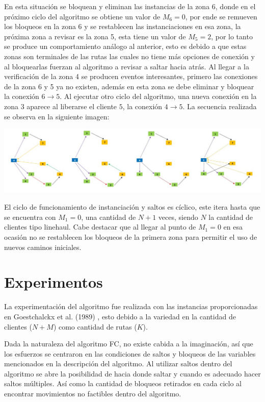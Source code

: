 \documentclass[letter, 10pt]{article}
\begin{document}
En esta situación se bloquean y eliminan las instancias de la zona 6, donde en el próximo ciclo del algoritmo se obtiene un valor de $M_6=0$, por ende se remueven los bloqueos en la zona 6 y se restablecen las instanciaciones en esa zona, la próxima zona a revisar es la zona 5, esta tiene un valor de $M_5=2$, por lo tanto se produce un comportamiento análogo al anterior, esto es debido a que estas zonas son terminales de las rutas las cuales no tiene más opciones de conexión y al bloquearlas fuerzan al algoritmo a revisar a saltar hacia atrás. Al llegar a la verificación de la zona 4 se producen eventos interesantes, primero las conexiones de la zona 6 y 5 ya no existen, además en esta zona se debe eliminar y bloquear la conexión $6 \rightarrow 5$. Al ejecutar otro ciclo del algoritmo, una nueva conexión en la zona 3 aparece al liberarse el cliente $5$, la conexión $4 \rightarrow 5$. La secuencia realizada se observa en la siguiente imagen:

\begin{center}
\includegraphics[scale=.45]{ruta_cambio.jpg}
\end{center}

El ciclo de funcionamiento de instanciación y saltos es cíclico, este itera hasta que se encuentra con $M_1 = 0$, una cantidad de $N + 1$ veces, siendo $N$ la cantidad de clientes tipo linehaul. Cabe destacar que al llegar al punto de $M_1 = 0$ en esa ocasión no se restablecen los bloqueos de la primera zona para permitir el uso de nuevos caminos iniciales.

\section{Experimentos}
La experimentación del algoritmo fue realizada con las instancias proporcionadas en Goestchalckx et al. (1989) \cite{goetschalckx1989vehicle}, esto debido a la variedad en la cantidad de clientes ($N+M$) como cantidad de rutas ($K$).

Dada la naturaleza del algoritmo FC, no existe cabida a la imaginación, así que los esfuerzos se centraron en las condiciones de saltos y bloqueos de las variables mencionados en la descripción del algoritmo. Al utilizar saltos dentro del algoritmo se abre la posibilidad de hacia donde saltar y cuando es adecuado hacer saltos múltiples. Así como la cantidad de bloqueos retirados en cada ciclo al encontrar movimientos no factibles dentro del algoritmo.
\end{document}
